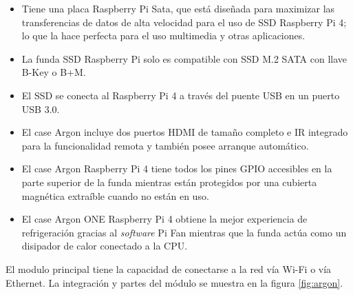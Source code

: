 \begin{itemize}
\item Tiene una placa Raspberry Pi Sata, que está diseñada para maximizar las transferencias de datos de alta velocidad para el uso de SSD Raspberry Pi 4; lo que la hace perfecta para el uso multimedia y otras aplicaciones. 
\item La funda SSD Raspberry Pi solo es compatible con SSD M.2 SATA con llave B-Key o B+M.
\item El SSD se conecta al Raspberry Pi 4 a través del puente USB en un puerto USB 3.0. 
\item El case Argon incluye dos puertos HDMI de tamaño completo e IR integrado para la funcionalidad remota y también posee arranque automático. 
\item El case Argon Raspberry Pi 4 tiene todos los pines GPIO accesibles en la parte superior de la funda mientras están protegidos por una cubierta magnética extraíble cuando no están en uso. 
\item El case Argon ONE Raspberry Pi 4 obtiene la mejor experiencia de refrigeración gracias al \emph{software} Pi Fan mientras que la funda actúa como un disipador de calor conectado a la CPU.
\end{itemize}

El modulo principal tiene la capacidad de conectarse a la red vía Wi-Fi o vía Ethernet. La integración y partes del módulo se muestra en la figura \ref{fig:argon}.



